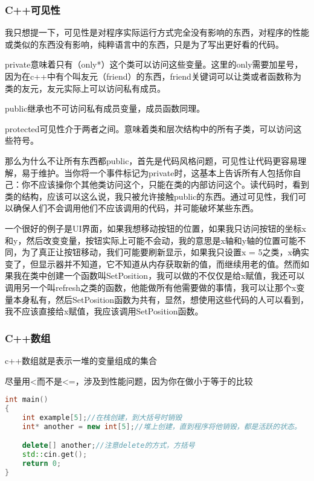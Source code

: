 \subsubsection{C++可见性}

我只想提一下，可见性是对程序实际运行方式完全没有影响的东西，对程序的性能或类似的东西没有影响，纯粹语言中的东西，只是为了写出更好看的代码。

{\ncodestyle private}意味着只有{\ncodestyle （only*）}这个类可以访问这些变量。这里的only需要加星号，因为在c++中有个叫{\ncodestyle 友元（friend）}的东西，{\ncodestyle friend}关键词可以让类或者函数称为类的友元，友元实际上可以访问私有成员。

public继承也不可访问私有成员变量，成员函数同理。

{\ncodestyle protected}可见性介于两者之间。意味着类和层次结构中的所有子类，可以访问这些符号。

那么为什么不让所有东西都{\ncodestyle public}，首先是代码风格问题，可见性让代码更容易理解，易于维护。当你将一个事件标记为{\ncodestyle private}时，这基本上告诉所有人包括你自己：你不应该操你个其他类访问这个，只能在类的内部访问这个。读代码时，看到类的结构，应该可以这么说，我只被允许接触{\ncodestyle public}的东西。通过可见性，我们可以确保人们不会调用他们不应该调用的代码，并可能破坏某些东西。

一个很好的例子是UI界面，如果我想移动按钮的位置，如果我只访问按钮的坐标{\ncodestyle x}和{\ncodestyle y}，然后改变变量，按钮实际上可能不会动，我的意思是x轴和y轴的位置可能不同，为了真正让按钮移动，我们可能要刷新显示，如果我只设置{\ncodestyle x = 5}之类，{\ncodestyle x}确实变了，但显示器并不知道，它不知道从内存获取新的值，而继续用老的值。然而如果我在类中创建一个函数叫{\ncodestyle SetPosition}，我可以做的不仅仅是给x赋值，我还可以调用另一个叫{\ncodestyle refresh}之类的函数，他能做所有他需要做的事情，我可以让那个{\ncodestyle x}变量本身私有，然后{\ncodestyle SetPosition}函数为共有，显然，想使用这些代码的人可以看到，我不应该直接给{\ncodestyle x}赋值，我应该调用SetPosition函数。


\subsubsection{C++数组}

c++数组就是表示一堆的变量组成的集合

尽量用{\ncodestyle <}而不是{\ncodestyle <=}，涉及到性能问题，因为你在做小于等于的比较


\begin{lstlisting}[language=c++]
int main()
{
    int example[5];//在栈创建，到大括号时销毁
    int* another = new int[5];//堆上创建，直到程序将他销毁，都是活跃的状态。

    delete[] another;//注意delete的方式，方括号
    std::cin.get();
    return 0;
}
\end{lstlisting}

